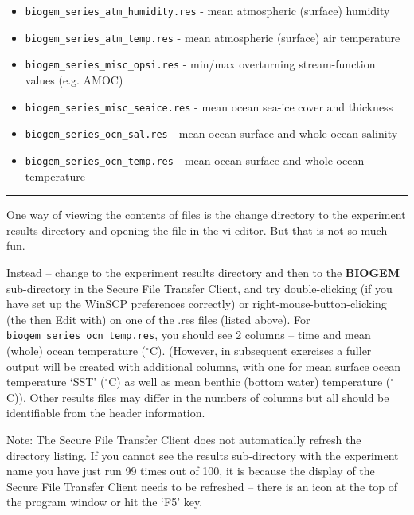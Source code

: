 \documentclass[11pt,fleqn]{book} %
\begin{document}
\begin{itemize}[noitemsep]
\setlength{\itemindent}{.2in}
\item \texttt{biogem\_series\_atm\_humidity.res}  - mean atmospheric (surface) humidity
\item \texttt{biogem\_series\_atm\_temp.res}      - mean atmospheric (surface) air temperature
\item \texttt{biogem\_series\_misc\_opsi.res}     - min/max overturning stream-function values (e.g. AMOC)
\item \texttt{biogem\_series\_misc\_seaice.res}   - mean ocean sea-ice cover and thickness
\item \texttt{biogem\_series\_ocn\_sal.res}       - mean ocean surface and whole ocean salinity
\item \texttt{biogem\_series\_ocn\_temp.res}      - mean ocean surface and whole ocean temperature
\end{itemize}

\vspace{1mm}
\noindent\rule{4cm}{0.1mm}
\vspace{2mm}

One way of viewing the contents of files is the change directory to the experiment results directory and opening the file in the vi editor. But that is not so much fun.

Instead – change to the experiment results directory and then to the \textbf{BIOGEM} sub-directory in the Secure File Transfer Client, and try double-clicking (if you have set up the WinSCP preferences correctly) or right-mouse-button-clicking (the then Edit with) on one of the .res files (listed above). For \texttt{biogem\_series\_ocn\_temp.res}, you should see 2 columns – time and mean (whole) ocean temperature ($^{\circ}$C). (However, in subsequent exercises a fuller output will be created with additional columns, with one for mean surface ocean temperature ‘SST’ ($^{\circ}$C) as well as mean benthic (bottom water) temperature ($^{\circ}$C)). Other results files may differ in the numbers of columns but all should be identifiable from the header information.

Note: The Secure File Transfer Client does not automatically refresh the directory listing. If you cannot see the results sub-directory with the experiment name you have just run 99 times out of 100, it is because the display of the Secure File Transfer Client needs to be refreshed -- there is an icon at the top of the program window or hit the ‘F5’ key.
\end{document}
